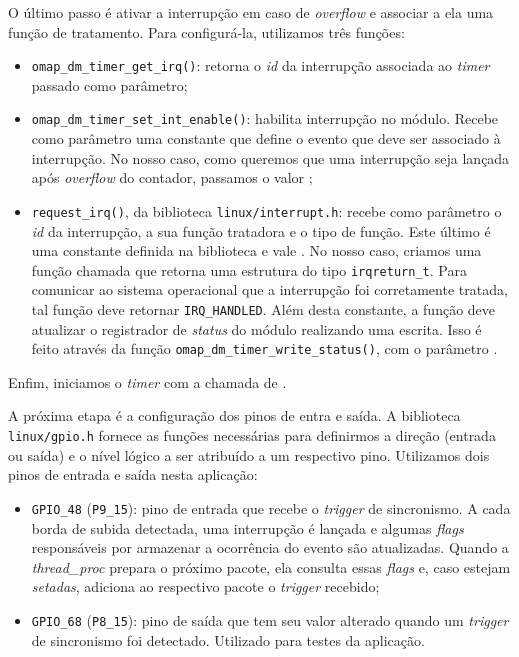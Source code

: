 O último passo é ativar a interrupção em caso de \textit{overflow} e associar a
ela uma função de tratamento. Para configurá-la, utilizamos três funções:

\begin{itemize} \renewcommand\labelitemi{--}
  \item \texttt{omap\_dm\_timer\_get\_irq()}: retorna o \textit{id} da
  interrupção associada ao \textit{timer} passado como parâmetro;

  \item \texttt{omap\_dm\_timer\_set\_int\_enable()}: habilita interrupção no
  módulo. Recebe como parâmetro uma constante que define o evento que deve ser
  associado à interrupção. No nosso caso, como queremos que uma interrupção seja
  lançada após \textit{overflow} do contador, passamos o valor
  ;

  \item \texttt{request\_irq()}, da biblioteca \texttt{linux/interrupt.h}:
  recebe como parâmetro o \textit{id} da interrupção, a sua função tratadora e
  o tipo de função. Este último é uma constante definida na biblioteca e vale
  . No nosso caso, criamos uma função chamada
   que retorna uma estrutura do tipo \texttt{irqreturn\_t}. Para comunicar ao sistema
  operacional que a interrupção foi corretamente tratada, tal função deve
  retornar \texttt{IRQ\_HANDLED}. Além desta constante, a função deve atualizar
  o registrador de \textit{status} do módulo realizando uma escrita. Isso é
  feito através da função \texttt{omap\_dm\_timer\_write\_status()}, com o
  parâmetro .
\end{itemize}
 
Enfim, iniciamos o \textit{timer} com a chamada de .

\vspace{12pt}

A próxima etapa é a configuração dos pinos de entra e saída. A biblioteca
\texttt{linux/gpio.h} fornece as funções necessárias para definirmos a direção
(entrada ou saída) e o nível lógico a ser atribuído a um respectivo pino.
Utilizamos dois pinos de entrada e saída nesta aplicação:

\begin{itemize} \renewcommand\labelitemi{--}
  \item \texttt{GPIO\_48} (\texttt{P9\_15}): pino de entrada que recebe o
  \textit{trigger} de sincronismo. A cada borda de subida detectada, uma
  interrupção é lançada e algumas \textit{flags} responsáveis por armazenar a
  ocorrência do evento são atualizadas. Quando a \textit{thread\_proc} prepara o
  próximo pacote, ela consulta essas \textit{flags} e, caso estejam
  \textit{setadas}, adiciona ao respectivo pacote o \textit{trigger} recebido;

  \item \texttt{GPIO\_68} (\texttt{P8\_15}): pino de saída que tem seu valor
  alterado quando um \textit{trigger} de sincronismo foi detectado. Utilizado
  para testes da aplicação.
\end{itemize}

